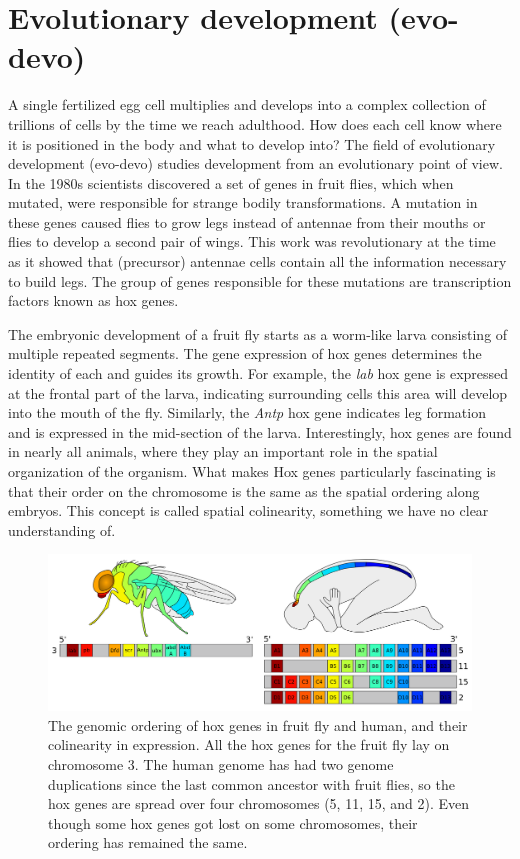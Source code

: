 \section{Evolutionary development (evo-devo)}

A single fertilized egg cell multiplies and develops into a complex collection of trillions of cells by the time we reach adulthood. How does each cell know where it is positioned in the body and what to develop into? The field of evolutionary development (evo-devo) studies development from an evolutionary point of view. In the 1980s scientists discovered a set of genes in fruit flies, which when mutated, were responsible for strange bodily transformations. A mutation in these genes caused flies to grow legs instead of antennae from their mouths\cite{Schneuwly1987} or flies to develop a second pair of wings\cite{Weatherbee1998}. This work was revolutionary at the time as it showed that (precursor) antennae cells contain all the information necessary to build legs. The group of genes responsible for these mutations are transcription factors known as hox genes.

The embryonic development of a fruit fly starts as a worm-like larva consisting of multiple repeated segments. The gene expression of hox genes determines the identity of each  and guides its growth. For example, the \textit{lab} hox gene is expressed at the frontal part of the larva, indicating surrounding cells this area will develop into the mouth of the fly\cite{Hughes2002}. Similarly, the \textit{Antp} hox gene indicates leg formation and is expressed in the mid-section of the larva. Interestingly, hox genes are found in nearly all animals, where they play an important role in the spatial organization of the organism. What makes Hox genes particularly fascinating is that their order on the chromosome is the same as the spatial ordering along embryos. This concept is called spatial colinearity, something we have no clear understanding of\cite{Gaunt2015}.

\begin{figure}
    \center
    \includegraphics[width=\linewidth]{ch.introduction/imgs/hox.png}
    \caption{The genomic ordering of hox genes in fruit fly and human, and their colinearity in expression. All the hox genes for the fruit fly lay on chromosome 3. The human genome has had two genome duplications since the last common ancestor with fruit flies, so the hox genes are spread over four chromosomes (5, 11, 15, and 2). Even though some hox genes got lost on some chromosomes, their ordering has remained the same.}
    \label{fig:hox}
\end{figure}

